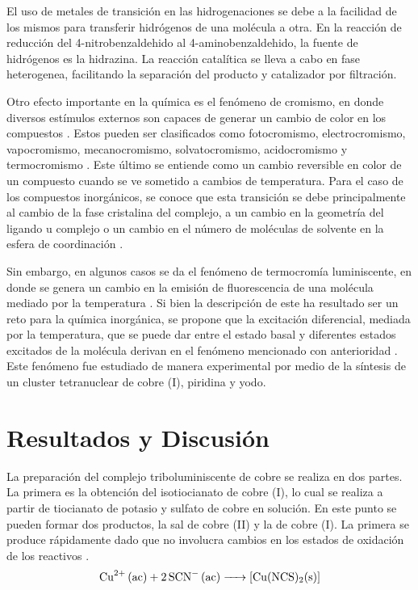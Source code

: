 \documentclass[fleqn,10pt]{SelfArx}
\begin{document}
El uso de metales de transici\'on en las hidrogenaciones se debe a la facilidad de los mismos para transferir hidr\'ogenos de una mol\'ecula a otra. En la reacci\'on de reducci\'on del 4-nitrobenzaldehido al 4-aminobenzaldehido, la fuente de hidr\'ogenos es la hidrazina. La reacci\'on catal\'itica se lleva a cabo en fase heterogenea, facilitando la separaci\'on del producto y catalizador por filtraci\'on.

Otro efecto importante en la química es el fenómeno de cromismo, en donde diversos estímulos externos son capaces de generar un cambio de color en los compuestos \cite{yang_li_zhang_zhang_2016}. Estos pueden ser clasificados como fotocromismo, electrocromismo, vapocromismo, mecanocromismo, solvatocromismo, acidocromismo y termocromismo \cite{yang_li_zhang_zhang_2016}. Este último se entiende como un cambio reversible en color de un compuesto cuando se ve sometido a cambios de temperatura. Para el caso de los compuestos inorgánicos, se conoce que esta transición se debe principalmente al cambio de la fase cristalina del complejo, a un cambio en la geometría del ligando u complejo o un cambio en el número de moléculas de solvente en la esfera de coordinación \cite{day_1968}.

Sin embargo, en algunos casos se da el fenómeno de termocromía luminiscente, en donde se genera un cambio en la emisión de fluorescencia de una molécula mediado por la temperatura \cite{parmeggiani_sacchetti_2012}. Si bien la descripción de este ha resultado ser un reto para la química inorgánica, se propone que la excitación diferencial, mediada por la temperatura, que se puede dar entre el estado basal y diferentes estados excitados de la molécula derivan en el fenómeno mencionado con anterioridad \cite{parmeggiani_sacchetti_2012}. Este fenómeno fue estudiado de manera experimental por medio de la síntesis de un cluster tetranuclear de cobre (I), piridina y yodo. 

\section{Resultados y Discusi\'on}
La preparaci\'on del complejo triboluminiscente de cobre se realiza en dos partes. La primera es la obtenci\'on del isotiocianato de cobre (I), lo cual se realiza a partir de tiocianato de potasio y sulfato de cobre en soluci\'on. En este punto se pueden formar dos productos, la sal de cobre (II) y la de cobre (I). La primera se produce r\'apidamente dado que no involucra cambios en los estados de oxidaci\'on de los reactivos \cite{tykodi_1991}\cite{tudela_1993}.
\begin{equation}
	\ce{Cu^{2+} (ac) + 2SCN- (ac) -> [Cu(NCS)2(s)]}
\end{equation}
\end{document}
